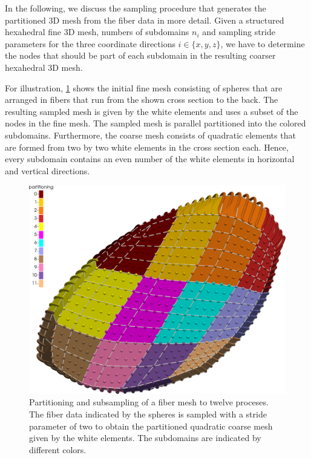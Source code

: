 In the following, we discuss the sampling procedure that generates the partitioned 3D mesh from the fiber data in more detail.
Given a structured hexahedral fine 3D mesh, numbers of subdomains $n_i$ and sampling stride parameters  for the three coordinate directions $i\in\{x,y,z\}$, we have to determine the nodes that should be part of each subdomain in the resulting coarser hexahedral 3D mesh. 

For illustration, \cref{fig:partitioning1} shows the initial fine mesh consisting of spheres that are arranged in fibers that run from the shown cross section to the back. The resulting sampled mesh is given by the white elements and uses a subset of the nodes in the fine mesh. The sampled mesh is parallel partitioned into the colored subdomains. 
Furthermore, the coarse mesh consists of quadratic elements that are formed from two by two white elements in the cross section each. Hence, every subdomain contains an even number of the white elements in horizontal and vertical directions.

\begin{figure}
  \centering%
  \includegraphics[width=\textwidth]{images/implementation/partitioning7.png}%
  \caption{Partitioning and subsampling of a fiber mesh to twelve proceses. The fiber data indicated by the spheres is sampled with a stride parameter of two to obtain the partitioned quadratic coarse mesh given by the white elements. The subdomains are indicated by different colors.}%
  \label{fig:partitioning1}%
\end{figure}%


